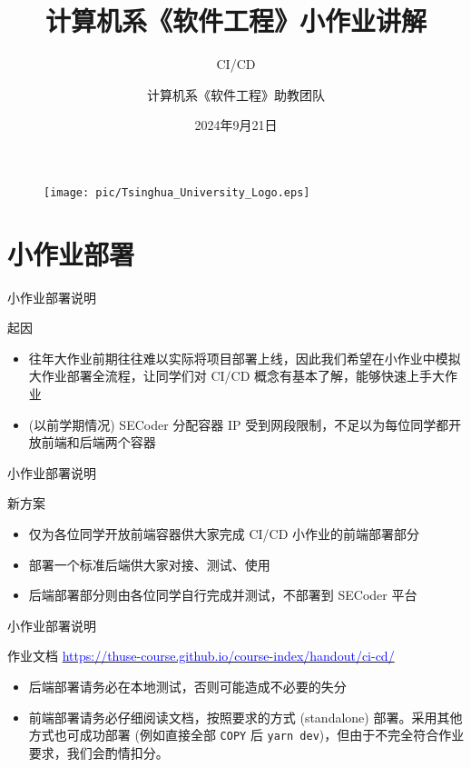 \documentclass{beamer}
\author{计算机系《软件工程》助教团队}
\title{计算机系《软件工程》小作业讲解}
\subtitle{CI/CD}
\institute{清华大学计算机科学与技术系}
\date{2024年9月21日}
\begin{document}
\begin{frame}
    \titlepage
    \begin{figure}[htpb]
        \begin{center}
            \texttt{[image: pic/Tsinghua\_University\_Logo.eps]}
        \end{center}
    \end{figure}
\end{frame}

\begin{frame}
    \tableofcontents[sectionstyle=show,subsectionstyle=show/shaded/hide,subsubsectionstyle=show/shaded/hide]
\end{frame}

\section{小作业部署}

\begin{frame}{小作业部署说明}
    \begin{block}{起因}
        \begin{itemize}
            \item 往年大作业前期往往难以实际将项目部署上线，因此我们希望在小作业中模拟大作业部署全流程，让同学们对 CI/CD 概念有基本了解，能够快速上手大作业
            \item (以前学期情况) SECoder 分配容器 IP 受到网段限制，不足以为每位同学都开放前端和后端两个容器
        \end{itemize}
    \end{block}
\end{frame}

\begin{frame}{小作业部署说明}
    \begin{block}{新方案}
        \begin{itemize}
            \item 仅为各位同学开放前端容器供大家完成 CI/CD 小作业的前端部署部分
            \item 部署一个标准后端供大家对接、测试、使用
            \item 后端部署部分则由各位同学自行完成并测试，不部署到 SECoder 平台
        \end{itemize}
    \end{block}
\end{frame}

\begin{frame}{小作业部署说明}
    \begin{block}{作业文档}
        \href{https://thuse-course.github.io/course-index/handout/ci-cd/}{\textcolor{blue}{https://thuse-course.github.io/course-index/handout/ci-cd/}}
        \begin{itemize}
            \item 后端部署请务必在本地测试，否则可能造成不必要的失分
            \item 前端部署请务必仔细阅读文档，按照要求的方式 (standalone) 部署。采用其他方式也可成功部署 (例如直接全部 \texttt{COPY} 后 \texttt{yarn dev})，但由于不完全符合作业要求，我们会酌情扣分。
        \end{itemize}
    \end{block}
\end{frame}
\end{document}
